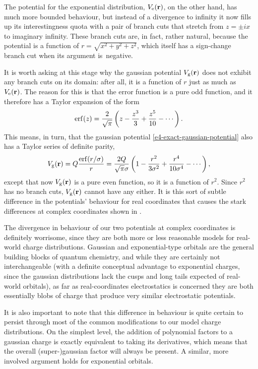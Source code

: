 The potential for the exponential distribution, $V_\mathrm{e}(\vb{r})$, on the other hand, has much more bounded behaviour, but instead of a divergence to infinity it now fills up its interestingness quota with a pair of branch cuts that stretch from $z=\pm i x$ to imaginary infinity. These branch cuts are, in fact, rather natural, because the potential is a function of $r=\sqrt{x^2+y^2+z^2}$, which itself has a sign-change branch cut when its argument is~negative.


It is worth asking at this stage why the gaussian potential $V_\mathrm{g}(\vb{r})$ does not exhibit any branch cuts on its domain: after all, it is a function of $r$ just as much as $V_\mathrm{e}(\vb{r})$. The reason for this is that the error function is a pure odd function, and it therefore has a Taylor expansion  of the form
\begin{equation}
\erf(z)
=\frac{2}{\sqrt{\pi}}\left( z - \frac{z^3}{3} + \frac{z^5}{10} - \cdots \right)
.
\end{equation}
This means, in turn, that the gaussian potential \eqref{e4-exact-gaussian-potential} also has a Taylor series of definite parity,
\begin{equation}
\Vg(\vbr) 
=
Q \frac{ \erf(r/\sigma) }{ r }
=
\frac{2Q}{\sqrt{\pi}\sigma}\left( 1 - \frac{r^2}{3\sigma^2} + \frac{r^4}{10\sigma^4} - \cdots \right)
,
\end{equation}
except that now $V_\mathrm{g}(\vb{r})$ is a pure even function, so it is a function of $r^2$. Since $r^2$ has no branch cuts, $V_\mathrm{g}(\vb{r})$ cannot have any either. It is this sort of subtle difference in the potentials' behaviour for real coordinates that causes the stark differences at complex coordinates shown in .


The divergence in behaviour of our two potentials at complex coordinates is definitely worrisome, since they are both more or less reasonable models for real-world charge distributions. Gaussian and exponential-type orbitals are the general building blocks of quantum chemistry, and while they are certainly not interchangeable (with a definite conceptual advantage to exponential charges, since the gaussian distributions lack the cusps and long tails expected of real-world orbitals), as far as real-coordinates electrostatics is concerned they are both essentially blobs of charge that produce very similar electrostatic potentials. 


It is also important to note that this difference in behaviour is quite certain to persist through most of the common modifications to our model charge distributions. On the simplest level, the addition of polynomial factors to a gaussian charge is exactly equivalent to taking its derivatives, which means that the overall (super-)gaussian factor will always be present. A similar, more involved argument holds for exponential orbitals.

